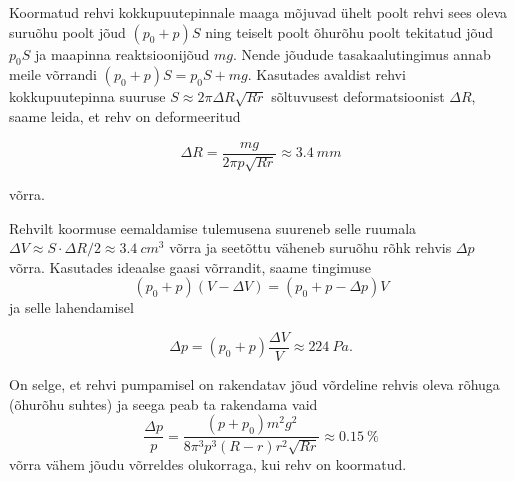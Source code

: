 \solu
Koormatud rehvi kokkupuutepinnale maaga mõjuvad ühelt poolt rehvi sees oleva suruõhu poolt jõud $\left(p_{0}+p\right)S$ ning teiselt
poolt õhurõhu poolt tekitatud jõud $p_{0}S$ ja maapinna reaktsioonijõud $mg$. Nende jõudude tasakaalutingimus annab meile võrrandi $\left(p_{0}+p\right)S=p_{0}S+mg.$ Kasutades avaldist rehvi kokkupuutepinna suuruse $S\approx2\pi\Delta R\sqrt{Rr}$ sõltuvusest deformatsioonist $\Delta R$, saame leida, et rehv on deformeeritud

\begin{equation}
\Delta R=\frac{mg}{2\pi p\sqrt{Rr}}\approx\SI{3.4}{mm}
\end{equation}

\noindent võrra.

Rehvilt koormuse eemaldamise tulemusena suureneb selle ruumala $\Delta V\approx S\cdot\Delta R/2\approx\SI{3.4}{cm^{3}}$ võrra ja seetõttu väheneb suruõhu rõhk rehvis $\Delta p$ võrra. Kasutades ideaalse gaasi võrrandit, saame tingimuse
\[
\left(p_{0}+p\right)\left(V-\Delta V\right)=\left(p_{0}+p-\Delta p\right)V
\]
ja selle lahendamisel

\begin{equation}
\Delta p=\left(p_{0}+p\right)\frac{\Delta V}{V}\approx\SI{224}{Pa}.
\end{equation}

On selge, et rehvi pumpamisel on rakendatav jõud võrdeline rehvis oleva rõhuga (õhurõhu suhtes) ja seega peab ta rakendama vaid 
\[
\frac{\Delta p}{p}=\frac{\left(p+p_{0}\right)m^{2}g^{2}}{8\pi^{3}p^{3}\left(R-r\right)r^{2}\sqrt{Rr}}\approx\SI{0.15}{\percent}
\]
võrra vähem jõudu võrreldes olukorraga, kui rehv on koormatud.

